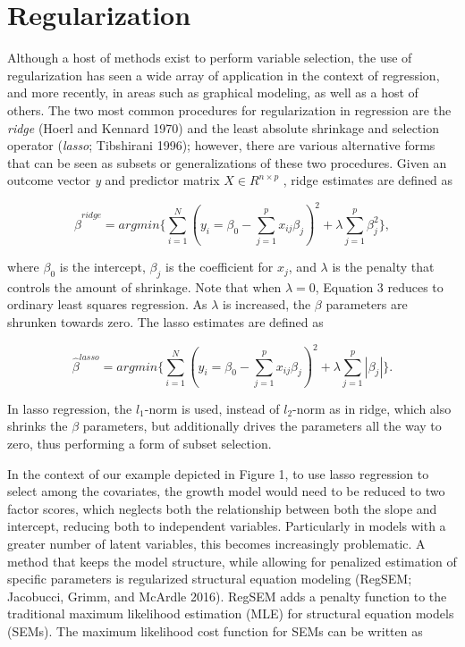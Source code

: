 \documentclass[article]{jss}
\begin{document}
\section{Regularization}\label{regularization}

Although a host of methods exist to perform variable selection, the use
of regularization has seen a wide array of application in the context of
regression, and more recently, in areas such as graphical modeling, as
well as a host of others. The two most common procedures for
regularization in regression are the \textit{ridge} (Hoerl and Kennard
1970) and the least absolute shrinkage and selection operator
(\textit{lasso}; Tibshirani 1996); however, there are various
alternative forms that can be seen as subsets or generalizations of
these two procedures. Given an outcome vector \textit{y} and predictor
matrix \(X \in {R}^{n \times p}\) , ridge estimates are defined as

\[\tag{1}
\hat{\beta}^{ridge}= argmin \Big\{ \sum_{i=1}^{N} (y_{i} = \beta_{0} - \sum_{j=1}^{p}x_{ij} \beta_{j})^{2}  + \lambda \sum_{j=1}^{p} \beta_{j}^{2}\Big\},
\]

where \(\beta_{0}\) is the intercept, \(\beta_{j}\) is the coefficient
for \(x_{j}\), and \(\lambda\) is the penalty that controls the amount
of shrinkage. Note that when \(\lambda = 0\), Equation 3 reduces to
ordinary least squares regression. As \(\lambda\) is increased, the
\(\beta\) parameters are shrunken towards zero. The lasso estimates are
defined as

\[\tag{2}
\hat{\beta}^{lasso}= argmin \Big\{ \sum_{i=1}^{N} (y_{i} = \beta_{0} - \sum_{j=1}^{p}x_{ij} \beta_{j})^{2}  + \lambda \sum_{j=1}^{p}|\beta_{j}|\Big\}.
\]

In lasso regression, the \(l_{1}\)-norm is used, instead of
\(l_{2}\)-norm as in ridge, which also shrinks the \(\beta\) parameters,
but additionally drives the parameters all the way to zero, thus
performing a form of subset selection.

In the context of our example depicted in Figure 1, to use lasso
regression to select among the covariates, the growth model would need
to be reduced to two factor scores, which neglects both the relationship
between both the slope and intercept, reducing both to independent
variables. Particularly in models with a greater number of latent
variables, this becomes increasingly problematic. A method that keeps
the model structure, while allowing for penalized estimation of specific
parameters is regularized structural equation modeling (RegSEM;
Jacobucci, Grimm, and McArdle 2016). RegSEM adds a penalty function to
the traditional maximum likelihood estimation (MLE) for structural
equation models (SEMs). The maximum likelihood cost function for SEMs
can be written as
\end{document}

